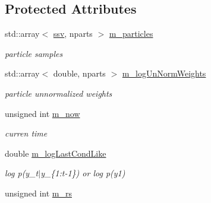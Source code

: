 \subsection*{Protected Attributes}
\begin{DoxyCompactItemize}
\item 
std\+::array$<$ \hyperlink{classAPF_add8c737c90d68dc165d1e60dcd6b3b20}{ssv}, nparts $>$ \hyperlink{classAPF_adec547bd6568af3f5651da94a82f30ed}{m\+\_\+particles}\hypertarget{classAPF_adec547bd6568af3f5651da94a82f30ed}{}\label{classAPF_adec547bd6568af3f5651da94a82f30ed}

\begin{DoxyCompactList}\small\item\em particle samples \end{DoxyCompactList}\item 
std\+::array$<$ double, nparts $>$ \hyperlink{classAPF_a547d0cf72ee005ecb370c1aabd9d00d3}{m\+\_\+log\+Un\+Norm\+Weights}\hypertarget{classAPF_a547d0cf72ee005ecb370c1aabd9d00d3}{}\label{classAPF_a547d0cf72ee005ecb370c1aabd9d00d3}

\begin{DoxyCompactList}\small\item\em particle unnormalized weights \end{DoxyCompactList}\item 
unsigned int \hyperlink{classAPF_a67f224951b324ceb5bc1bd96ccab36d7}{m\+\_\+now}\hypertarget{classAPF_a67f224951b324ceb5bc1bd96ccab36d7}{}\label{classAPF_a67f224951b324ceb5bc1bd96ccab36d7}

\begin{DoxyCompactList}\small\item\em curren time \end{DoxyCompactList}\item 
double \hyperlink{classAPF_a066b490852fd0c87ffbf371cc4d30303}{m\+\_\+log\+Last\+Cond\+Like}\hypertarget{classAPF_a066b490852fd0c87ffbf371cc4d30303}{}\label{classAPF_a066b490852fd0c87ffbf371cc4d30303}

\begin{DoxyCompactList}\small\item\em log p(y\+\_\+t$\vert$y\+\_\+\{1\+:t-\/1\}) or log p(y1) \end{DoxyCompactList}\item 
unsigned int \hyperlink{classAPF_af7b5b31bf3661709337c0a1979342a10}{m\+\_\+rs}\hypertarget{classAPF_af7b5b31bf3661709337c0a1979342a10}{}\label{classAPF_af7b5b31bf3661709337c0a1979342a10}


\end{DoxyCompactItemize}
